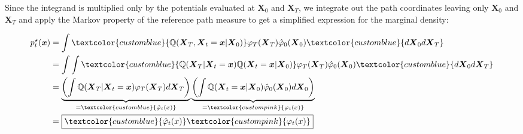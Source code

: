 \documentclass{article}
\newcommand{\bluetext}[1]{\textcolor{customblue}{#1}}
\newcommand{\pinktext}[1]{\textcolor{custompink}{#1}}
\begin{document}
Since the integrand is multiplied only by the potentials evaluated at $\boldsymbol{X}_0$ and $\boldsymbol{X}_T$, we integrate out the path coordinates leaving only $\boldsymbol{X}_0$ and $\boldsymbol{X}_T$ and apply the Markov property of the reference path measure to get a simplified expression for the marginal density:
\begin{small}
\begin{align}
    p^\star_t(\boldsymbol{x})&=\int\bluetext{\mathbb{Q}(\boldsymbol{X}_T, \boldsymbol{X}_t=\boldsymbol{x}|\boldsymbol{X}_0)}\varphi_T(\boldsymbol{X}_T)\hat{\varphi}_0(\boldsymbol{X}_0)\bluetext{d\boldsymbol{X}_0d\boldsymbol{X}_T}\nonumber\\
    &=\int\int\bluetext{\mathbb{Q}(\boldsymbol{X}_T| \boldsymbol{X}_t=\boldsymbol{x})\mathbb{Q}(\boldsymbol{X}_t=\boldsymbol{x}|\boldsymbol{X}_0)}\varphi_T(\boldsymbol{X}_T)\hat{\varphi}_0(\boldsymbol{X}_0)\bluetext{d\boldsymbol{X}_0d\boldsymbol{X}_T}\nonumber\\
    &=\underbrace{\left(\int\mathbb{Q}(\boldsymbol{X}_T| \boldsymbol{X}_t=\boldsymbol{x})\varphi_T(\boldsymbol{X}_T)d\boldsymbol{X}_T\right)}_{=\bluetext{\hat{\varphi}_t(x)}}\underbrace{\left(\int\mathbb{Q}(\boldsymbol{X}_t=\boldsymbol{x}|\boldsymbol{X}_0)\hat{\varphi}_0(\boldsymbol{X}_0)d\boldsymbol{X}_0\right)}_{=\pinktext{\varphi_t(x)}}\nonumber\\
    &=\boxed{\bluetext{\hat{\varphi}_t(x)}\pinktext{\varphi_t(x)}}
\end{align}
\end{small}
\end{document}
